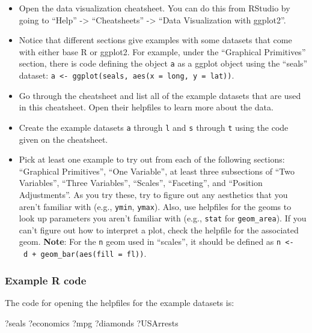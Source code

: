 \documentclass[]{book}
\makeatletter
\newenvironment{Shaded}{\begin{snugshade}}{\end{snugshade}}
\newcommand{\NormalTok}[1]{#1}
\providecommand{\tightlist}{%
  \setlength{\itemsep}{0pt}\setlength{\parskip}{0pt}}
\newenvironment{kframe}{%
\medskip{}
\setlength{\fboxsep}{.8em}
 \def\at@end@of@kframe{}%
 \ifinner\ifhmode%
  \def\at@end@of@kframe{\end{minipage}}%
  \begin{minipage}{\columnwidth}%
 \fi\fi%
 \def\FrameCommand##1{\hskip\@totalleftmargin \hskip-\fboxsep
 \colorbox{shadecolor}{##1}\hskip-\fboxsep
     \hskip-\linewidth \hskip-\@totalleftmargin \hskip\columnwidth}%
 \MakeFramed {\advance\hsize-\width
   \@totalleftmargin\z@ \linewidth\hsize
   \@setminipage}}%
 {\par\unskip\endMakeFramed%
 \at@end@of@kframe}
\renewenvironment{Shaded}{\begin{kframe}}{\end{kframe}}
\theoremstyle{definition}
\theoremstyle{definition}
\theoremstyle{definition}
\theoremstyle{remark}
\makeatother
\begin{document}
\begin{itemize}
\tightlist
\item
  Open the data visualization cheatsheet. You can do this from RStudio
  by going to ``Help'' -\textgreater{} ``Cheatsheets'' -\textgreater{}
  ``Data Visualization with ggplot2''.
\item
  Notice that different sections give examples with some datasets that
  come with either base R or ggplot2. For example, under the ``Graphical
  Primitives'' section, there is code defining the object \texttt{a} as
  a ggplot object using the ``seals'' dataset:
  \texttt{a\ \textless{}-\ ggplot(seals,\ aes(x\ =\ long,\ y\ =\ lat))}.
\item
  Go through the cheatsheet and list all of the example datasets that
  are used in this cheatsheet. Open their helpfiles to learn more about
  the data.
\item
  Create the example datasets \texttt{a} through \texttt{l} and
  \texttt{s} through \texttt{t} using the code given on the cheatsheet.
\item
  Pick at least one example to try out from each of the following
  sections: ``Graphical Primitives'', ``One Variable'', at least three
  subsections of ``Two Variables'', ``Three Variables'', ``Scales'',
  ``Faceting'', and ``Position Adjustments''. As you try these, try to
  figure out any aesthetics that you aren't familiar with (e.g.,
  \texttt{ymin}, \texttt{ymax}). Also, use helpfiles for the geoms to
  look up parameters you aren't familiar with (e.g., \texttt{stat} for
  \texttt{geom\_area}). If you can't figure out how to interpret a plot,
  check the helpfile for the associated geom. \textbf{Note}: For the
  \texttt{n} geom used in ``scales'', it should be defined as
  \texttt{n\ \textless{}-\ d\ +\ geom\_bar(aes(fill\ =\ fl))}.
\end{itemize}

\subsubsection{Example R code}\label{example-r-code-7}

The code for opening the helpfiles for the example datasets is:

\begin{Shaded}
\begin{Highlighting}[]
\NormalTok{?seals}
\NormalTok{?economics}
\NormalTok{?mpg}
\NormalTok{?diamonds}
\NormalTok{?USArrests}
\end{Highlighting}
\end{Shaded}
\end{document}
